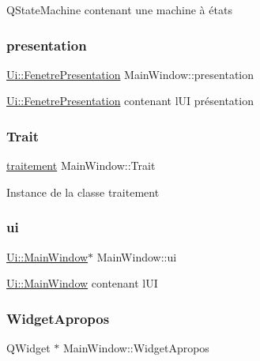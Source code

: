 Q\+State\+Machine contenant une machine à états \mbox{\label{class_main_window_a12b3703287f602303f92ced702c2b88f}} 
\subsubsection{\texorpdfstring{presentation}{presentation}}
{\footnotesize\ttfamily \hyperlink{class_ui_1_1_fenetre_presentation}{Ui\+::\+Fenetre\+Presentation} Main\+Window\+::presentation\hspace{0.3cm}{\ttfamily [private]}}

\hyperlink{class_ui_1_1_fenetre_presentation}{Ui\+::\+Fenetre\+Presentation} contenant l\textquotesingle{}UI présentation \mbox{\label{class_main_window_a1dfb1b1b22d99fccae16abadec84523f}} 
\subsubsection{\texorpdfstring{Trait}{Trait}}
{\footnotesize\ttfamily \hyperlink{classtraitement}{traitement} Main\+Window\+::\+Trait\hspace{0.3cm}{\ttfamily [private]}}

Instance de la classe traitement \mbox{\label{class_main_window_a35466a70ed47252a0191168126a352a5}} 
\subsubsection{\texorpdfstring{ui}{ui}}
{\footnotesize\ttfamily \hyperlink{class_ui_1_1_main_window}{Ui\+::\+Main\+Window}$\ast$ Main\+Window\+::ui\hspace{0.3cm}{\ttfamily [private]}}

\hyperlink{class_ui_1_1_main_window}{Ui\+::\+Main\+Window} contenant l\textquotesingle{}UI \mbox{\label{class_main_window_a8a1bf5356fafc93d0b6560427fd022e2}} 
\subsubsection{\texorpdfstring{Widget\+Apropos}{WidgetApropos}}
{\footnotesize\ttfamily Q\+Widget $\ast$ Main\+Window\+::\+Widget\+Apropos\hspace{0.3cm}{\ttfamily [private]}}


